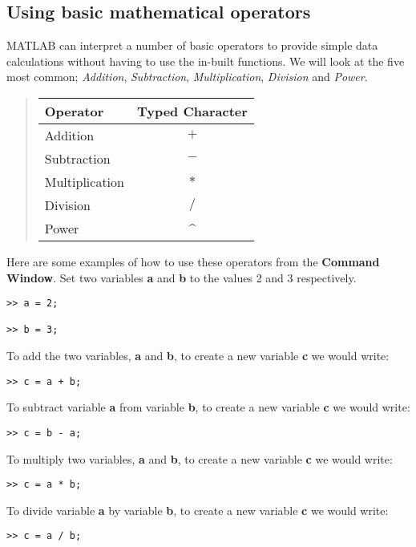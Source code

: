 \documentclass[12pt,a4paper]{article}
\begin{document}
\subsection{Using basic mathematical operators}
MATLAB can interpret a number of basic operators to provide simple data calculations without having to use the in-built functions.  We will look at the five most common; \emph{Addition}, \emph{Subtraction}, \emph{Multiplication}, \emph{Division} and \emph{Power}.
\begin{quotation}
\begin{tabular}{l c}
\toprule
Operator & Typed Character \\
\midrule
Addition & $+$\\
Subtraction & $-$\\
Multiplication & $*$\\
Division & $/$\\
Power & \textasciicircum \\
\bottomrule
\end{tabular}
\end{quotation}	
	
Here are some examples of how to use these operators from the \textbf{Command Window}.  Set two variables \textbf{a} and \textbf{b} to the values 2 and 3 respectively.
\begin{lstlisting}[style=Matlab-editor]
>> a = 2;

>> b = 3;
\end{lstlisting}

To add the two variables, \textbf{a} and \textbf{b}, to create a new variable \textbf{c} we would write:
\begin{lstlisting}[style=Matlab-editor]
>> c = a + b;
\end{lstlisting}

To subtract variable \textbf{a} from variable \textbf{b}, to create a new variable \textbf{c} we would write:
\begin{lstlisting}[style=Matlab-editor]
>> c = b - a;
\end{lstlisting}

To multiply two variables, \textbf{a} and \textbf{b}, to create a new variable \textbf{c} we would write:
\begin{lstlisting}[style=Matlab-editor]
>> c = a * b;
\end{lstlisting}

To divide variable \textbf{a} by variable \textbf{b}, to create a new variable \textbf{c} we would write:
\begin{lstlisting}[style=Matlab-editor]
>> c = a / b;
\end{lstlisting}
\end{document}
